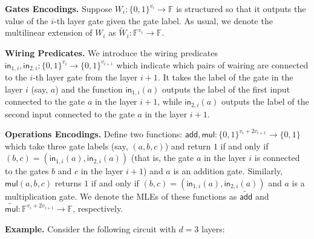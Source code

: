 \textbf{Gates Encodings.} Suppose $W_i: \{0,1\}^{v_i} \to \mathbb{F}$ is
structured so that it outputs the value of the $i$-th layer gate given the gate
label. As usual, we denote the multilinear extension of $W_i$ as
$\widetilde{W}_i: \mathbb{F}^{v_i} \to \mathbb{F}$.

\textbf{Wiring Predicates.} We introduce the wiring predicates
$\mathsf{in}_{1,i}, \mathsf{in}_{2,i}: \{0,1\}^{v_i} \to \{0,1\}^{v_{i+1}}$
which indicate which pairs of wairing are connected to the $i$-th layer gate
from the layer $i+1$. It takes the label of the gate in the layer $i$ (say, $a$)
and the function $\mathsf{in}_{1,i}(a)$ outputs the label of the first input
connected to the gate $a$ in the layer $i+1$, while $\mathsf{in}_{2,i}(a)$
outputs the label of the second input connected to the gate $a$ in the layer
$i+1$.

\textbf{Operations Encodings.} Define two functions: $\mathsf{add},\mathsf{mul}:
\{0,1\}^{v_i+2v_{i+1}} \to \{0,1\}$ which take three gate labels (say,
$(a,b,c)$) and return $1$ if and only if $(b,c)=(\mathsf{in}_{1,i}(a),
\mathsf{in}_{2,i}(a))$ (that is, the gate $a$ in the layer $i$ is connected to
the gates $b$ and $c$ in the layer $i+1$) and $a$ is an addition gate.
Similarly, $\mathsf{mul}(a,b,c)$ returns $1$ if and only if
$(b,c)=(\mathsf{in}_{1,i}(a), \mathsf{in}_{2,i}(a))$ and $a$ is a multiplication
gate. We denote the MLEs of these functions as $\widetilde{\mathsf{add}}$ and
$\widetilde{\mathsf{mul}}: \mathbb{F}^{v_i+2v_{i+1}} \to \mathbb{F}$,
respectively.

\textbf{Example.} Consider the following circuit with $d=3$ layers:

